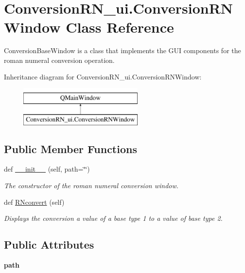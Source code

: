 \hypertarget{class_conversion_r_n__ui_1_1_conversion_r_n_window}{}\section{Conversion\+R\+N\+\_\+ui.\+Conversion\+R\+N\+Window Class Reference}
\label{class_conversion_r_n__ui_1_1_conversion_r_n_window}


Conversion\+Base\+Window is a class that implements the G\+UI components for the roman numeral conversion operation.  


Inheritance diagram for Conversion\+R\+N\+\_\+ui.\+Conversion\+R\+N\+Window\+:\begin{figure}[H]
\begin{center}
\leavevmode
\includegraphics[height=2.000000cm]{class_conversion_r_n__ui_1_1_conversion_r_n_window}
\end{center}
\end{figure}
\subsection*{Public Member Functions}
\begin{DoxyCompactItemize}
\item 
def \hyperlink{class_conversion_r_n__ui_1_1_conversion_r_n_window_aa4752dfe8364faa4649c2c19ff55fba6}{\+\_\+\+\_\+init\+\_\+\+\_\+} (self, path=\char`\"{}\char`\"{})
\begin{DoxyCompactList}\small\item\em The constructor of the roman numeral conversion window. \end{DoxyCompactList}\item 
def \hyperlink{class_conversion_r_n__ui_1_1_conversion_r_n_window_a0c015e92809a27ecde70f4b62e102da4}{R\+Nconvert} (self)
\begin{DoxyCompactList}\small\item\em Displays the conversion a value of a base type 1 to a value of base type 2. \end{DoxyCompactList}\end{DoxyCompactItemize}
\subsection*{Public Attributes}
\begin{DoxyCompactItemize}
\item 
\mbox{\label{class_conversion_r_n__ui_1_1_conversion_r_n_window_aa7468d2c903a7f327f268ac030509639}} 
{\bfseries path}
\end{DoxyCompactItemize}


